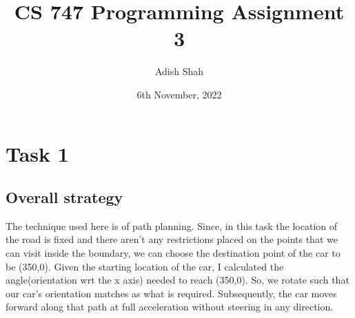 \documentclass{article}
\begin{document}
\title{CS 747 Programming Assignment 3}
\author{Adish Shah}
\date{6th November, 2022}
\maketitle
\tableofcontents
\thispagestyle{empty}



\maketitle

\newpage
\thispagestyle{fancy}

\section{Task 1}
\subsection{Overall strategy}
The technique used here is of path planning. Since, in this task the location of the road is fixed and there aren't any restrictions placed on the points that we can visit inside the boundary, we can choose the destination point of the car to be 
(350,0). Given the starting location of the car, I calculated the angle(orientation wrt the x axis) needed to reach (350,0). So, we rotate such that our car's orientation matches as what is required. Subsequently, 
the car moves forward along that path at full acceleration without steering in any direction.
\end{document}
